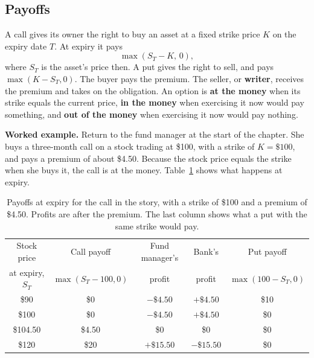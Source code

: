 \subsection{Payoffs}

A call gives its owner the right to buy an asset at a fixed strike price $K$ on the expiry date $T$. At expiry it pays
\begin{equation}
  \max(S_T - K,\, 0),
  \label{eq:14-call-payoff}
\end{equation}
where $S_T$ is the asset's price then. A put gives the right to sell, and pays $\max(K - S_T, 0)$. The buyer pays the premium. The seller, or \textbf{writer}, receives the premium and takes on the obligation. An option is \textbf{at the money} when its strike equals the current price, \textbf{in the money} when exercising it now would pay something, and \textbf{out of the money} when exercising it now would pay nothing.


\textbf{Worked example.} Return to the fund manager at the start of the chapter. She buys a three-month call on a stock trading at \$100, with a strike of $K = \$100$, and pays a premium of about \$4.50. Because the stock price equals the strike when she buys it, the call is at the money. Table~\ref{tab:14-payoff} shows what happens at expiry.

\begin{table}[htbp]
\centering
\caption{Payoffs at expiry for the call in the story, with a strike of \$100 and a premium of \$4.50. Profits are after the premium. The last column shows what a put with the same strike would pay.}
\label{tab:14-payoff}
\begin{tabular}{@{}ccccc@{}}
\toprule
Stock price & Call payoff & Fund manager's & Bank's & Put payoff \\
at expiry, $S_T$ & $\max(S_T - 100, 0)$ & profit & profit & $\max(100 - S_T, 0)$ \\
\midrule
\$90     & \$0     & $-\$4.50$  & $+\$4.50$  & \$10 \\
\$100    & \$0     & $-\$4.50$  & $+\$4.50$  & \$0 \\
\$104.50 & \$4.50  & \$0        & \$0        & \$0 \\
\$120    & \$20    & $+\$15.50$ & $-\$15.50$ & \$0 \\
\bottomrule
\end{tabular}
\end{table}

